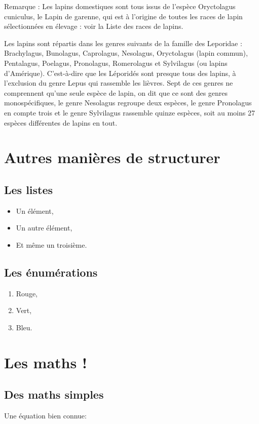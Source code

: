\documentclass{article}
\begin{document}
Remarque : Les lapins domestiques sont tous issus de l'espèce Oryctolagus cuniculus, le Lapin de garenne, qui est à l'origine de toutes les races de lapin sélectionnées en élevage : voir la Liste des races de lapins.

Les lapins sont répartis dans les genres suivants de la famille des Leporidae : Brachylagus, Bunolagus, Caprolagus, Nesolagus, Oryctolagus (lapin commun), Pentalagus, Poelagus, Pronolagus, Romerolagus et Sylvilagus (ou lapins d'Amérique). C'est-à-dire que les Léporidés sont presque tous des lapins, à l'exclusion du genre Lepus qui rassemble les lièvres. Sept de ces genres ne comprennent qu'une seule espèce de lapin, on dit que ce sont des genres monospécifiques, le genre Nesolagus regroupe deux espèces, le genre Pronolagus en compte trois et le genre Sylvilagus rassemble quinze espèces, soit au moins 27 espèces différentes de lapins en tout.
\section{Autres manières de structurer}
\subsection{Les listes}
\begin{itemize}
\item Un élément,
\item Un autre élément,
\item Et même un troisième.
\end{itemize}

\subsection{Les énumérations}
\begin{enumerate}
\item Rouge,
\item Vert,
\item Bleu.
\end{enumerate}

\section{Les maths !}

\subsection{Des maths simples}

Une équation bien connue:
\end{document}
